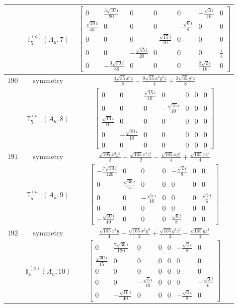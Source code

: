 \documentclass[fleqn,8pt,landscape]{jsarticle}
\begin{document}
\begin{longtable}{ccc}
$  $ & $ \mathbb{T}_{5}^{(a)}(A_{u},7) $ & $ \begin{bmatrix} 0 & \frac{3 \sqrt{10} i}{80} & 0 & 0 & 0 & - \frac{\sqrt{6} i}{16} & 0 \\ \frac{\sqrt{10} i}{40} & 0 & 0 & 0 & - \frac{\sqrt{6} i}{8} & 0 & 0 \\ 0 & 0 & 0 & - \frac{\sqrt{15} i}{10} & 0 & 0 & 0 \\ 0 & 0 & - \frac{\sqrt{15} i}{20} & 0 & 0 & 0 & \frac{i}{4} \\ 0 & - \frac{3 \sqrt{30} i}{80} & 0 & 0 & 0 & \frac{3 \sqrt{2} i}{16} & 0 \end{bmatrix} $ \\ \hline
$ 190 $ & $ \text{symmetry} $ & $ \frac{3 \sqrt{35} x^{4} z}{8} - \frac{9 \sqrt{35} x^{2} y^{2} z}{4} + \frac{3 \sqrt{35} y^{4} z}{8} $ \\
$  $ & $ \mathbb{T}_{5}^{(a)}(A_{u},8) $ & $ \begin{bmatrix} 0 & 0 & \frac{\sqrt{15} i}{10} & 0 & 0 & 0 & 0 \\ 0 & 0 & 0 & - \frac{\sqrt{15} i}{10} & 0 & 0 & 0 \\ \frac{\sqrt{10} i}{10} & 0 & 0 & 0 & 0 & 0 & 0 \\ 0 & - \frac{\sqrt{10} i}{10} & 0 & 0 & 0 & 0 & 0 \\ 0 & 0 & 0 & 0 & 0 & 0 & 0 \end{bmatrix} $ \\ \hline
$ 191 $ & $ \text{symmetry} $ & $ \frac{\sqrt{105} x^{3} y^{2}}{2} - \frac{\sqrt{105} x^{3} z^{2}}{2} - \frac{\sqrt{105} x y^{4}}{4} + \frac{\sqrt{105} x z^{4}}{4} $ \\
$  $ & $ \mathbb{T}_{5}^{(a)}(A_{u},9) $ & $ \begin{bmatrix} - \frac{7 \sqrt{30} i}{120} & 0 & 0 & 0 & - \frac{\sqrt{2} i}{8} & 0 & 0 \\ 0 & \frac{\sqrt{30} i}{15} & 0 & 0 & 0 & 0 & 0 \\ 0 & 0 & - \frac{\sqrt{5} i}{10} & 0 & 0 & 0 & \frac{\sqrt{3} i}{6} \\ 0 & 0 & 0 & 0 & 0 & 0 & 0 \\ - \frac{\sqrt{10} i}{40} & 0 & 0 & 0 & \frac{\sqrt{6} i}{8} & 0 & 0 \end{bmatrix} $ \\ \hline
$ 192 $ & $ \text{symmetry} $ & $ \frac{\sqrt{105} x^{4} y}{4} - \frac{\sqrt{105} x^{2} y^{3}}{2} + \frac{\sqrt{105} y^{3} z^{2}}{2} - \frac{\sqrt{105} y z^{4}}{4} $ \\
$  $ & $ \mathbb{T}_{5}^{(a)}(A_{u},10) $ & $ \begin{bmatrix} 0 & \frac{7 \sqrt{30} i}{120} & 0 & 0 & 0 & - \frac{\sqrt{2} i}{8} & 0 \\ \frac{\sqrt{30} i}{15} & 0 & 0 & 0 & 0 & 0 & 0 \\ 0 & 0 & 0 & 0 & 0 & 0 & 0 \\ 0 & 0 & - \frac{\sqrt{5} i}{10} & 0 & 0 & 0 & - \frac{\sqrt{3} i}{6} \\ 0 & - \frac{\sqrt{10} i}{40} & 0 & 0 & 0 & - \frac{\sqrt{6} i}{8} & 0 \end{bmatrix} $ \\ \hline

\end{longtable}
\end{document}
